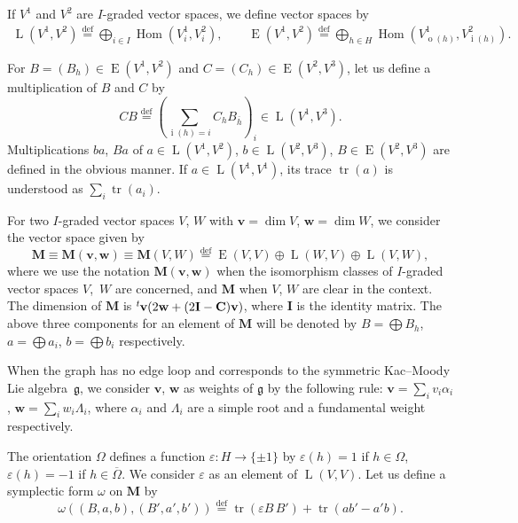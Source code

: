 \documentclass[11pt]{article}
\theoremstyle{definition}
\numberwithin{equation}{section}
\newcommand{\lsp}[2]{{\mskip-.3mu}{}^{#1}\mskip-1mu{#2}}
\newcommand{\defeq}{\overset{\operatorname{\scriptstyle def}}{=}}
\newcommand{\g}{{\mathfrak g}}
\newcommand{\Hom}{\operatorname{Hom}}
\newcommand{\tr}{\operatorname{tr}}
\newcommand{\vin}[1]{\operatorname{i}(#1)} %
\newcommand{\vout}[1]{\operatorname{o}(#1)} %
\newcommand{\bM}{{\mathbf M}} %
\newcommand{\bv}{{\mathbf v}} %
\newcommand{\bw}{{\mathbf w}} %
\newcommand{\bC}{{\mathbf C}} %
\newcommand{\bI}{{\mathbf I}} %
\newcommand{\HomE}{\operatorname{E}}
\newcommand{\HomL}{\operatorname{L}}
\begin{document}
If $V^1$ and $V^2$ are $I$-graded vector spaces, we def\/ine vector spaces by
\begin{gather*}
  \HomL(V^1, V^2) \defeq
  \bigoplus_{i\in I} \Hom(V^1_i, V^2_i), \qquad
  \HomE(V^1, V^2) \defeq
  \bigoplus_{h\in H} \Hom(V^1_{\vout{h}}, V^2_{\vin{h}})
  .
\end{gather*}


For $B = (B_h) \in \HomE(V^1, V^2)$ and
$C = (C_h) \in \HomE(V^2, V^3)$, let us def\/ine a multiplication of $B$
and $C$ by
\[
  CB \defeq \left(\sum_{\vin{h} = i} C_h B_{\overline h}\right)_i \in
  \HomL(V^1, V^3).
\]
Multiplications $ba$, $Ba$ of $a\in \HomL(V^1,V^2)$, $b\in\HomL(V^2,
V^3)$, $B\in \HomE(V^2, V^3)$ are def\/ined in the obvious manner. If
$a\in\HomL(V^1, V^1)$, its trace $\tr(a)$ is understood as $\sum_i
\tr(a_i)$.

For two $I$-graded vector spaces $V$, $W$ with $\bv = \dim V$, $\bw =
\dim W$, we consider the vector space given by
\begin{equation*}\label{def:bM}
  \bM \equiv \bM(\bv,\bw) \equiv \bM(V, W) \defeq
  \HomE(V,V)\oplus \HomL(W,V)\oplus \HomL(V,W),
\end{equation*}
where we use the notation $\bM(\bv,\bw)$ when the isomorphism classes
of $I$-graded vector spaces $V$,~$W$ are concerned, and $\bM$ when
$V$, $W$ are clear in the context.
%
The dimension of $\bM$ is $\lsp{t}{\bv}(2\bw + (2\bI - \bC)\bv)$,
where $\bI$ is the identity matrix.
The above three components for an element of $\bM$ will be denoted by
$B = \bigoplus B_h $, $a = \bigoplus a_i$, $b = \bigoplus b_i$
respectively.

When the graph has no edge loop and corresponds to the symmetric
Kac--Moody Lie algeb\-ra~$\g$, we consider $\bv$, $\bw$ as weights of
$\g$ by the following rule: $\bv = \sum_i v_i \alpha_i$, $\bw = \sum_i
w_i\Lambda_i$, where $\alpha_i$ and $\Lambda_i$ are a simple root and
a fundamental weight respectively.

The orientation $\Omega$ def\/ines a function $\varepsilon\colon H \to
\{ \pm 1\}$ by $\varepsilon(h) = 1$ if $h\in\Omega$, $\varepsilon(h)=
-1$ if $h\in\overline\Omega$. We consider $\varepsilon$ as an element
of $\HomL(V, V)$.
%
Let us def\/ine a symplectic form $\omega$ on $\bM$ by
\begin{equation*}
        \omega((B, a, b), (B', a', b'))
        \defeq \tr(\varepsilon B\, B') + \tr(a b' - a' b).
\label{def:symplectic}\end{equation*}
\end{document}
